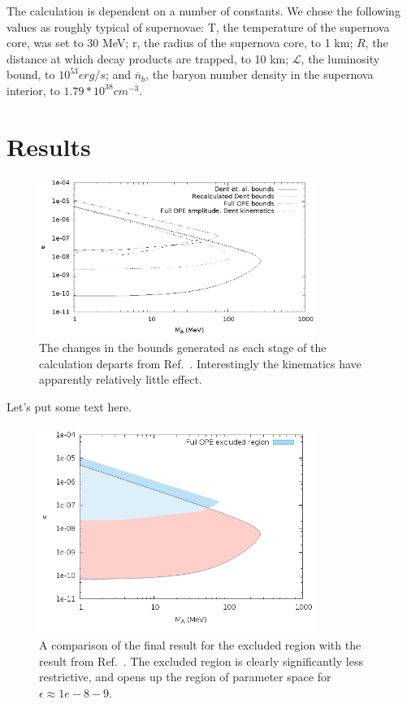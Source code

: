 \documentclass[nofootinbib,prd,superscriptaddress,twocolumn]{revtex4}
\newcommand{\n}{\overline{n}}
\begin{document}
The calculation is dependent on a number of constants. We chose the following values as roughly typical of supernovae: T, the temperature of the supernova core, was set to 30 MeV; r, the radius of the supernova core, to 1 km; $ R $, the distance at which decay products are trapped, to 10 km; $ \mathcal{L} $, the luminosity bound, to $ 10^{53} erg/s $; and $ \n_b $, the baryon number density in the supernova interior, to $ 1.79*10^{38} cm^{-3} $. 


\section{Results}
\label{section:results}

\begin{figure}[th]
\includegraphics[width=9cm]{stages.eps}
\caption{The changes in the bounds generated as each stage of the calculation departs from Ref.~\cite{dent_etal12}. Interestingly the kinematics have apparently relatively little effect.}
\end{figure}

Let's put some text here.

\begin{figure}[th]
	\includegraphics[width=9cm]{endtoend.png}
	\caption{A comparison of the final result for the excluded region with the result from Ref.~\cite{dent_etal12}. The excluded region is clearly significantly less restrictive, and opens up the region of parameter space for $\epsilon \approx  1e-8-9 $.}
\end{figure}
\end{document}
